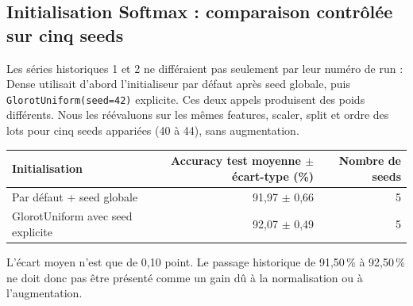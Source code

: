 \documentclass[10pt,a4paper]{article}
\newcommand{\pct}{\,\%\xspace}
\begin{document}
\subsection{Initialisation Softmax : comparaison contrôlée sur cinq seeds}
Les séries historiques 1 et 2 ne différaient pas seulement par leur numéro de run :
Dense utilisait d'abord l'initialiseur par défaut après seed globale, puis
\texttt{GlorotUniform(seed=42)} explicite. Ces deux appels produisent des poids différents.
Nous les réévaluons sur les mêmes features, scaler, split et ordre des lots pour cinq seeds
appariées (40 à 44), sans augmentation.
\begin{center}\small
\begin{tabular}{lrr}\toprule
Initialisation & Accuracy test moyenne $\pm$ écart-type (\%) & Nombre de seeds\\\midrule
Par défaut + seed globale & 91,97 $\pm$ 0,66 & 5 \\
GlorotUniform avec seed explicite & 92,07 $\pm$ 0,49 & 5 \\
\bottomrule\end{tabular}\end{center}
L'écart moyen n'est que de 0,10 point. Le passage historique de 91,50\pct à 92,50\pct
ne doit donc pas être présenté comme un gain dû à la normalisation ou à l'augmentation.

\clearpage
\end{document}
